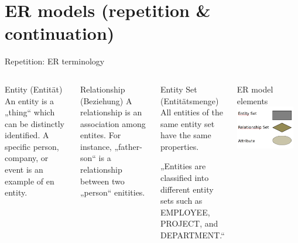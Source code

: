 

\section{ER models (repetition \& continuation)}

\begin{frame}{Repetition: ER terminology~\parencite[9--12]{chen1976}}
  \begin{columns}[T,onlytextwidth]
    \footnotesize
      \begin{block}{Entity (Entität)}
       An entity is a „thing“ which can be distinctly identified. A specific person, company, or event is an example of en entity.
      \end{block}

      \begin{alertblock}{Relationship (Beziehung)}
        A relationship is an association among entites. For instance, „father-son“ is a relationship between two „person“ enitities.
      \end{alertblock}

      \begin{exampleblock}{Entity Set (Entitätsmenge)}
        All entities of the same entity set have the same properties.
        
        „Entities are classified into different entity sets such as EMPLOYEE, PROJECT, and DEPARTMENT.“
      \end{exampleblock}




      \begin{block}{ER model elements}
      \includegraphics[width=0.9\textwidth]{img/er-modell.png}
      \end{block}
      

\end{columns}
\end{frame}
